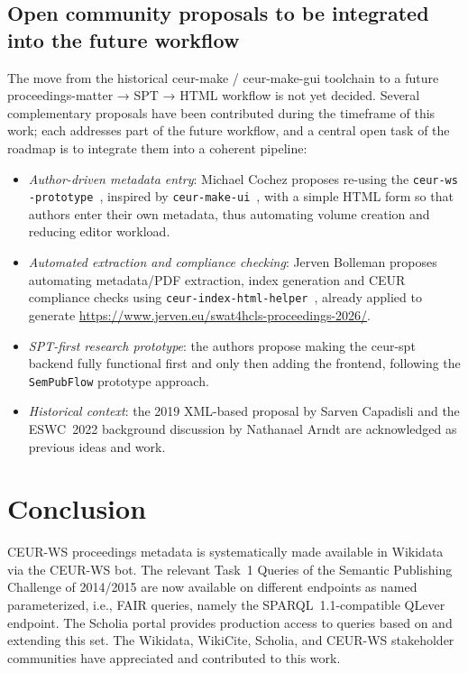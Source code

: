 \documentclass[runningheads]{llncs}
\begin{document}
\subsection{Open community proposals to be integrated into the future workflow}\label{sec:future_workflow}
The move from the historical ceur-make / ceur-make-gui toolchain to a future proceedings-matter → SPT → HTML workflow is not yet decided. Several complementary proposals have been contributed during the timeframe of this work; each addresses part of the future workflow, and a central open task of the roadmap is to integrate them into a coherent pipeline:
\begin{itemize}
    \item \emph{Author-driven metadata entry}: Michael Cochez proposes
    re-using the \texttt{ceur-ws\\-prototype}~\cite{CEURWSPrototype},
    inspired by \texttt{ceur-make-ui}~\cite{CEURMakeUI}, with a simple
    HTML form so that authors enter their own metadata, thus automating
    volume creation and reducing editor workload.
    \item \emph{Automated extraction and compliance checking}: Jerven
    Bolleman proposes automating metadata/PDF extraction, index
    generation and CEUR compliance checks using
    \texttt{ceur-index-html-helper}~\cite{CEURIndexHTMLHelper}, already
    applied to generate
    \url{https://www.jerven.eu/swat4hcls-proceedings-2026/}.
    \item \emph{SPT-first research prototype}: the authors propose
    making the ceur-spt backend fully functional first and only then
    adding the frontend, following the \texttt{SemPubFlow} prototype
    approach.
    \item \emph{Historical context}: the 2019 XML-based proposal by
    Sarven Capadisli and the ESWC~2022 background discussion by
    Nathanael Arndt are acknowledged as previous ideas and work.
\end{itemize}


\section{Conclusion}\label{sec:Conclusion}
CEUR-WS proceedings metadata is systematically made available in Wikidata via the CEUR-WS bot. The relevant Task~1 Queries of the Semantic Publishing Challenge of 2014/2015 are now available on different endpoints as named parameterized, i.e., FAIR queries, namely the  SPARQL~1.1-compatible QLever endpoint. The Scholia portal provides production access to queries based on and extending this set. The Wikidata, WikiCite, Scholia, and CEUR-WS stakeholder communities have appreciated and contributed to this work.
\end{document}
